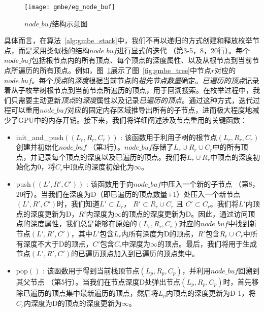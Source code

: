 \begin{figure} [t]
  \center
    \texttt{[image: gmbe/eg\_node\_buf]}
  \caption{$node\_buf$结构示意图}
  \label{fig:gmbe_node_buf}
\end{figure}


具体而言，在算法~\ref{alg:gmbe_stack}中，我们不再以递归的方式创建和释放枚举节点，而是采用类似栈的结构$node\_buf$进行显式的迭代 （第3-5，8，20行）。每个$node\_buf$包括根节点内的所有顶点、每个顶点的深度属性、以及从根节点到当前节点所遍历的所有顶点。例如，图~\ref{fig:gmbe_node_buf}展示了图~\ref{fig:gmbe_tree}中节点$r$对应的$node\_buf$。每个\textit{顶点}的\emph{\textit{深度}}根据当前节点的\emph{祖先节点数量}确定。\textit{已遍历的顶点}记录着从子枚举树根节点到当前节点所遍历的顶点，用于回溯搜索。在枚举过程中，我们只需要主动更新\textit{顶点}的\textit{深度}属性以及记录\textit{已遍历的顶点}。通过这种方式，迭代过程可以重用$node\_buf$对应的固定内存区域推导出所有的子节点，进而极大程度地减少了GPU中的内存开销。接下来，我们将详细阐述涉及节点重用的关键函数：



\begin{itemize}
  \item  \textsf{init\_and\_push}$((L_r,R_r,C_r))$ : 该函数用于利用子树的根节点$(L_r,R_r,C_r)$创建并初始化$node\_buf$ （第3行）。$node\_buf$存储了$L_r \cup R_r \cup C_r$中的所有顶点，并记录每个顶点的深度以及已遍历的顶点。我们将$L_r \cup R_r$中顶点的深度初始化为0，将$C_r$中顶点的深度初始化为$\infty$。
  
  \item  \textsf{push}$((L',R',C'))$ : 该函数用于向$node\_buf$中压入一个新的子节点 （第8，20行）。当我们在深度为D（即已遍历的顶点数量+1）处压入一个新节点$(L',R',C')$时，我们知道$L' \subset L_r$， $R' \subset R_r \cup C_r$ 且 $C' \subset C_r$。我们将$L'$内顶点的深度更新为D，$R'$内深度为$\infty$的顶点的深度更新为D。因此，通过访问顶点的深度属性，我们总是能够在原始的$(L_r,R_r,C_r)$对应的$node\_buf$中找到新节点$(L',R',C')$，其中$L'$包含$L_r$内所有深度为D的顶点，$R'$包含$R_r\cup C_r$中所有深度不大于D的顶点，$C'$包含$C_r$中深度为$\infty$的顶点。最后，我们将用于生成节点$(L',R',C')$的已遍历顶点加入到已遍历的顶点集中。

  \item  \textsf{pop}$()$ : 该函数用于得到当前栈顶节点$(L_p,R_p,C_p)$，并利用$node\_buf$回溯到其父节点 （第5行）。当我们在节点深度D处弹出节点$(L_p,R_p,C_p)$时，首先移除已遍历的顶点集中最新遍历的顶点，然后将$L_p$内顶点的深度更新为D-1，将$C_r$内深度为D的顶点的深度更新为$\infty$。
  
\end{itemize}





